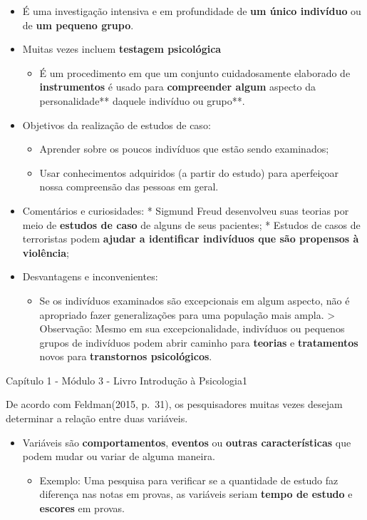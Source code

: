 \documentclass[
]{book}
\providecommand{\tightlist}{%
  \setlength{\itemsep}{0pt}\setlength{\parskip}{0pt}}
\begin{document}
\begin{itemize}
\tightlist
\item
  É uma investigação intensiva e em profundidade de \textbf{um único
  indivíduo} ou de \textbf{um pequeno grupo}.
\item
  Muitas vezes incluem \textbf{testagem psicológica}

  \begin{itemize}
  \tightlist
  \item
    É um procedimento em que um conjunto cuidadosamente elaborado de
    \textbf{instrumentos} é usado para \textbf{compreender algum} aspecto da
    personalidade** daquele indivíduo ou grupo**.
  \end{itemize}
\item
  Objetivos da realização de estudos de caso:

  \begin{itemize}
  \tightlist
  \item
    Aprender sobre os poucos indivíduos que estão sendo examinados;
  \item
    Usar conhecimentos adquiridos (a partir do estudo) para
    aperfeiçoar nossa compreensão das pessoas em geral.
  \end{itemize}
\item
  Comentários e curiosidades: * Sigmund Freud desenvolveu suas
  teorias por meio de \textbf{estudos de caso} de alguns de seus pacientes;
  * Estudos de casos de terroristas podem \textbf{ajudar a identificar
  indivíduos que são propensos à violência};
\item
  Desvantagens e inconvenientes:

  \begin{itemize}
  \tightlist
  \item
    Se os indivíduos examinados são excepcionais em algum aspecto,
    não é apropriado fazer generalizações para uma população mais
    ampla. \textgreater{} Observação: Mesmo em sua excepcionalidade, indivíduos
    ou pequenos grupos de indivíduos podem abrir caminho para
    \textbf{teorias} e \textbf{tratamentos} novos para \textbf{transtornos
    psicológicos}.
  \end{itemize}
\end{itemize}

Capítulo 1 - Módulo 3 - Livro Introdução à
Psicologia1

De acordo com Feldman(2015, p.~31), os pesquisadores muitas vezes
desejam determinar a relação entre duas variáveis.

\begin{itemize}
\tightlist
\item
  Variáveis são \textbf{comportamentos}, \textbf{eventos} ou
  \textbf{outras características} que podem mudar ou variar
  de alguma maneira.

  \begin{itemize}
  \tightlist
  \item
    Exemplo: Uma pesquisa para verificar se a quantidade de estudo
    faz diferença nas notas em provas, as variáveis seriam \textbf{tempo
    de estudo} e \textbf{escores} em provas.
  \end{itemize}
\end{itemize}
\end{document}
